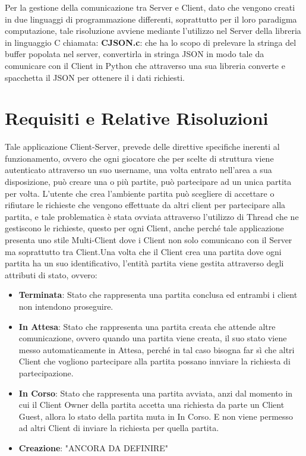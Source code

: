 \newline
Per la gestione della comunicazione tra Server e Client, dato che vengono creati in due linguaggi di programmazione differenti, soprattutto per il loro paradigma computazione, tale risoluzione avviene mediante l'utilizzo nel Server della libreria in linguaggio C chiamata:
\newline
\textbf{CJSON.c}: che ha lo scopo di prelevare la stringa del buffer popolata nel server, convertirla in stringa JSON in modo tale da comunicare con il Client in Python che attraverso una sua libreria converte e spacchetta il JSON per ottenere il i dati richiesti.

\section{Requisiti e Relative Risoluzioni}
Tale applicazione Client-Server, prevede delle direttive specifiche inerenti al funzionamento, ovvero che ogni giocatore che per scelte di struttura viene autenticato attraverso un suo username, una volta entrato nell'area a sua disposizione, può creare una o più partite, può partecipare ad un unica partita per volta. L'utente che crea l'ambiente partita può scegliere di accettare o rifiutare le richieste che vengono effettuate da altri client per partecipare alla partita, e tale problematica è stata ovviata attraverso l'utilizzo di Thread che ne gestiscono le richieste, questo per ogni Client, anche perché tale applicazione presenta uno stile Multi-Client dove i Client non solo comunicano con il Server ma soprattutto tra Client.Una volta che il Client crea una partita dove ogni partita ha un suo identificativo, l'entità partita viene gestita attraverso degli attributi di stato, ovvero:
\begin{itemize}
    \item \textbf{Terminata}: Stato che rappresenta una partita conclusa ed entrambi i                            client non intendono proseguire.
    \item \textbf{In Attesa}: Stato che rappresenta una partita creata che attende                                altre comunicazione, ovvero quando una partita viene                                creata, il suo stato viene messo automaticamente in                                 Attesa, perché in tal caso bisogna far sì che altri                                 Client che vogliono partecipare alla partita possano                                innviare la richiesta di partecipazione.
    
    \item \textbf{In Corso}: Stato che rappresenta una partita avviata, anzi dal                                 momento in cui il Client Owner della partita accetta una                            richiesta da parte un Client Guest, allora lo stato della                           partita muta in In Corso. E non viene permesso ad altri                             Client di inviare la richiesta per quella partita.

    \item \textbf{Creazione}: "ANCORA DA DEFINIRE"
\end{itemize}
